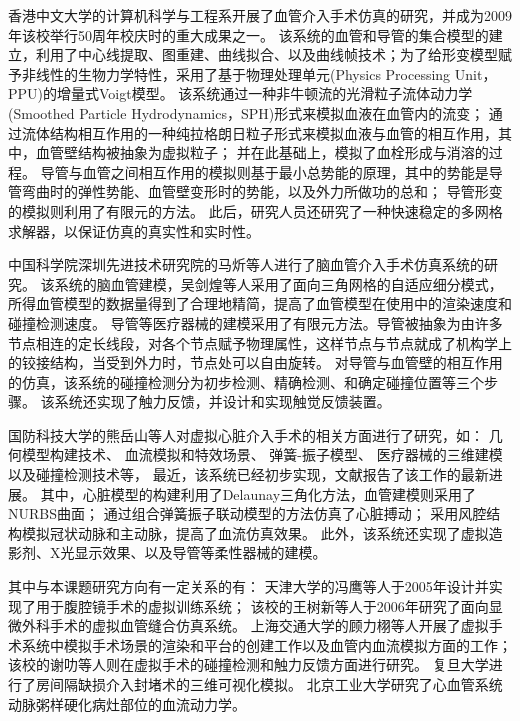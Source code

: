 香港中文大学的计算机科学与工程系开展了血管介入手术仿真的研究\cite{guo2007CUHK}\cite{Chui2010CUHK}\cite{Li2011CUHK}\cite{Li2012CUHK}，并成为2009年该校举行50周年校庆时的重大成果之一\cite{cuhkweb}。
该系统的血管和导管的集合模型的建立，利用了中心线提取、图重建、曲线拟合、以及曲线帧技术；为了给形变模型赋予非线性的生物力学特性，采用了基于物理处理单元(Physics Processing Unit，PPU)的增量式Voigt模型\cite{guo2007CUHK}。
该系统通过一种非牛顿流的光滑粒子流体动力学(Smoothed Particle Hydrodynamics，SPH)形式来模拟血液在血管内的流变；
通过流体结构相互作用的一种纯拉格朗日粒子形式来模拟血液与血管的相互作用，其中，血管壁结构被抽象为虚拟粒子；
并在此基础上，模拟了血栓形成与消溶的过程\cite{Chui2010CUHK}。
导管与血管之间相互作用的模拟则基于最小总势能的原理，其中的势能是导管弯曲时的弹性势能、血管壁变形时的势能，以及外力所做功的总和；
导管形变的模拟则利用了有限元的方法\cite{Li2011CUHK}。
此后，研究人员还研究了一种快速稳定的多网格求解器，以保证仿真的真实性和实时性\cite{Li2012CUHK}。

中国科学院深圳先进技术研究院的马炘等人\cite{Ma2010SIAT}\cite{Ma2010aSIAT}进行了脑血管介入手术仿真系统的研究。
该系统的脑血管建模，吴剑煌等人采用了面向三角网格的自适应细分模式\cite{Ma2010bSIAT}\cite{Wu2006SIAT}，所得血管模型的数据量得到了合理地精简，提高了血管模型在使用中的渲染速度和碰撞检测速度。
导管等医疗器械的建模采用了有限元方法。导管被抽象为由许多节点相连的定长线段，对各个节点赋予物理属性，这样节点与节点就成了机构学上的铰接结构，当受到外力时，节点处可以自由旋转\cite{Ma2010SIAT}。
对导管与血管壁的相互作用的仿真，该系统的碰撞检测分为初步检测、精确检测、和确定碰撞位置等三个步骤\cite{Ma2010SIAT}。
该系统还实现了触力反馈，并设计和实现触觉反馈装置\cite{Ma2010SIAT}。

国防科技大学的熊岳山等人对虚拟心脏介入手术的相关方面进行了研究，如：
几何模型构建技术\cite{han2005master}、
血流模拟和特效场景\cite{ren2005master}\cite{Ren2006NUDT}、
弹簧-振子模型\cite{wang2006master}\cite{Wang2008NUDT}、
医疗器械的三维建模\cite{zhu2007master}
以及碰撞检测技术\cite{kang2007master}等，
最近，该系统已经初步实现，文献\cite{Tan2012NUDT}报告了该工作的最新进展。
其中，心脏模型的构建利用了Delaunay三角化方法，血管建模则采用了NURBS曲面；
通过组合弹簧振子联动模型的方法仿真了心脏搏动\cite{Wang2008NUDT}；
采用风腔结构\cite{Ren2006NUDT}模拟冠状动脉和主动脉，提高了血流仿真效果。
此外，该系统还实现了虚拟造影剂、X光显示效果、以及导管等柔性器械的建模\cite{Tan2012NUDT}。

其中与本课题研究方向有一定关系的有：
天津大学的冯鹰\cite{li2005master}等人于2005年设计并实现了用于腹腔镜手术的虚拟训练系统；
该校的王树新等人\cite{zeng2006master}于2006年研究了面向显微外科手术的虚拟血管缝合仿真系统。
上海交通大学的顾力栩等人开展了虚拟手术系统中模拟手术场景的渲染和平台的创建工作\cite{zheng2008master}以及血管内血流模拟方面的工作\cite{huang2011virtual}；
该校的谢叻等人则在虚拟手术的碰撞检测\cite{wu2010virtual}和触力反馈\cite{wu2011virtual}方面进行研究。
复旦大学进行了房间隔缺损介入封堵术的三维可视化模拟\cite{Zhao2006Fudan}。
北京工业大学研究了心血管系统动脉粥样硬化病灶部位的血流动力学\cite{Huang2003BJUT}。

